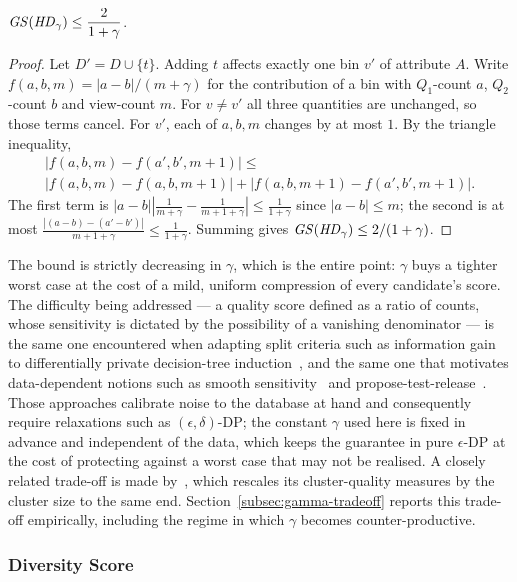 \begin{proposition}
\label{prop:hd-sensitivity}
$\mathit{GS}(\mathit{HD}_\gamma)\le \dfrac{2}{1+\gamma}$.
\end{proposition}

\begin{proof}
Let $D'=D\cup\{t\}$.
Adding $t$ affects exactly one bin $v'$ of attribute $A$.
Write $f(a,b,m)=|a-b|/(m+\gamma)$ for the contribution of a bin with $Q_1$-count $a$, $Q_2$-count $b$ and view-count $m$.
For $v\neq v'$ all three quantities are unchanged, so those terms cancel.
For $v'$, each of $a,b,m$ changes by at most $1$. By the triangle inequality,
\begin{multline*}
|f(a,b,m)-f(a',b',m{+}1)| \le\\
|f(a,b,m)-f(a,b,m{+}1)| + |f(a,b,m{+}1)-f(a',b',m{+}1)|.
\end{multline*}
The first term is $|a-b|\left|\tfrac{1}{m+\gamma}-\tfrac{1}{m+1+\gamma}\right| \le \tfrac{1}{1+\gamma}$ since $|a-b|\le m$; the second is at most $\tfrac{|(a-b)-(a'-b')|}{m+1+\gamma}\le \tfrac{1}{1+\gamma}$.
Summing gives $\mathit{GS}(\mathit{HD}_\gamma)\le 2/(1+\gamma)$.
\end{proof}

The bound is strictly decreasing in $\gamma$, which is the entire point: $\gamma$ buys a tighter worst case at the cost of a mild, uniform compression of every candidate's score.
The difficulty being addressed --- a quality score defined as a ratio of counts, whose sensitivity is dictated by the possibility of a vanishing denominator --- is the same one encountered when adapting split criteria such as information gain to differentially private decision-tree induction~\cite{FriedmanSchuster10}, and the same one that motivates data-dependent notions such as smooth sensitivity~\cite{NissimRS07} and propose-test-release~\cite{DworkLei09}.
Those approaches calibrate noise to the database at hand and consequently require relaxations such as $(\epsilon,\delta)$-DP; the constant $\gamma$ used here is fixed in advance and independent of the data, which keeps the guarantee in pure $\epsilon$-DP at the cost of protecting against a worst case that may not be realised.
A closely related trade-off is made by~\cite{DPClustX}, which rescales its cluster-quality measures by the cluster size to the same end.
Section~\ref{subsec:gamma-tradeoff} reports this trade-off empirically, including the regime in which $\gamma$ becomes counter-productive.

\subsubsection{Diversity Score}
\label{subsubsec:diversity-score}

